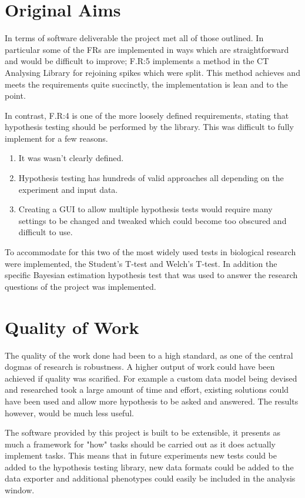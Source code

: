 \documentclass[11pt]{report}
\begin{document}
\section{Original Aims}
\label{sec:org0ea0d6d}
In terms of software deliverable the project met all of those outlined. In particular some of the FRs are implemented in ways which are straightforward and would be difficult to improve; F.R:5 implements a method in the CT Analysing Library for rejoining spikes which were split. This method achieves and meets the requirements quite succinctly, the implementation is lean and to the point.

In contrast, F.R:4 is one of the more loosely defined requirements, stating that hypothesis testing should be performed by the library. This was difficult to fully implement for a few reasons.

\begin{enumerate}
\item It was wasn't clearly defined.
\item Hypothesis testing has hundreds of valid approaches all depending on the experiment and input data.
\item Creating a GUI to allow multiple hypothesis tests would require many settings to be changed and tweaked which could become too obscured and difficult to use.
\end{enumerate}

To accommodate for this two of the most widely used tests in biological research were implemented, the Student's T-test and Welch's T-test. In addition the specific Bayesian estimation hypothesis test that was used to answer the research questions of the project was implemented.


\section{Quality of Work}
\label{sec:org8a3ab52}
The quality of the work done had been to a high standard, as one of the central dogmas of research is robustness. A higher output of work could have been achieved if quality was scarified. For example a custom data model being devised and researched took a large amount of time and effort, existing solutions could have been used and allow more hypothesis to be asked and answered. The results however, would be much less useful.

The software provided by this project is built to be extensible, it presents as much a framework for "how" tasks should be carried out as it does actually implement tasks. This means that in future experiments new tests could be added to the hypothesis testing library, new data formats could be added to the data exporter and additional phenotypes could easily be included in the analysis window.
\end{document}
